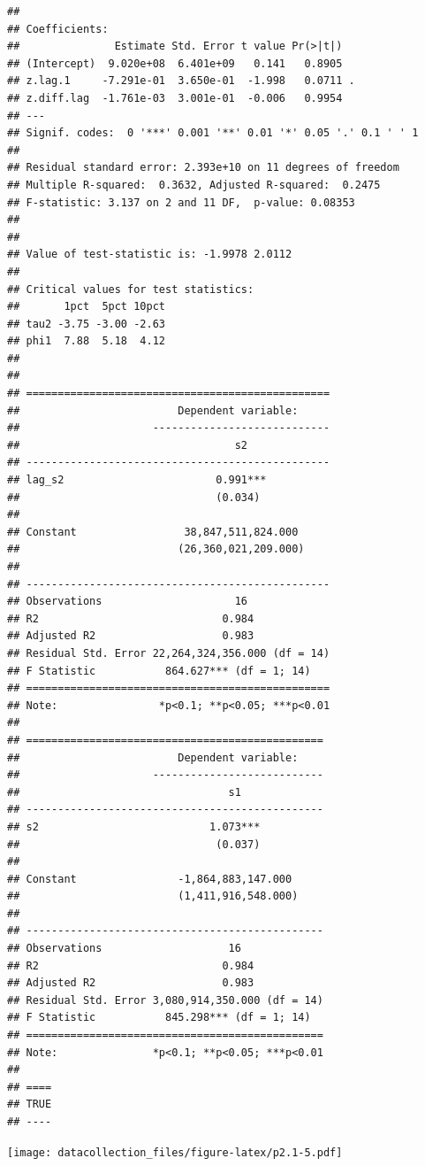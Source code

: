 \documentclass[
]{article}
\begin{document}
\begin{verbatim}
## 
## Coefficients:
##               Estimate Std. Error t value Pr(>|t|)  
## (Intercept)  9.020e+08  6.401e+09   0.141   0.8905  
## z.lag.1     -7.291e-01  3.650e-01  -1.998   0.0711 .
## z.diff.lag  -1.761e-03  3.001e-01  -0.006   0.9954  
## ---
## Signif. codes:  0 '***' 0.001 '**' 0.01 '*' 0.05 '.' 0.1 ' ' 1
## 
## Residual standard error: 2.393e+10 on 11 degrees of freedom
## Multiple R-squared:  0.3632, Adjusted R-squared:  0.2475 
## F-statistic: 3.137 on 2 and 11 DF,  p-value: 0.08353
## 
## 
## Value of test-statistic is: -1.9978 2.0112 
## 
## Critical values for test statistics: 
##       1pct  5pct 10pct
## tau2 -3.75 -3.00 -2.63
## phi1  7.88  5.18  4.12
## 
## 
## ================================================
##                         Dependent variable:     
##                     ----------------------------
##                                  s2             
## ------------------------------------------------
## lag_s2                        0.991***          
##                               (0.034)           
##                                                 
## Constant                 38,847,511,824.000     
##                         (26,360,021,209.000)    
##                                                 
## ------------------------------------------------
## Observations                     16             
## R2                             0.984            
## Adjusted R2                    0.983            
## Residual Std. Error 22,264,324,356.000 (df = 14)
## F Statistic           864.627*** (df = 1; 14)   
## ================================================
## Note:                *p<0.1; **p<0.05; ***p<0.01
## 
## ===============================================
##                         Dependent variable:    
##                     ---------------------------
##                                 s1             
## -----------------------------------------------
## s2                           1.073***          
##                               (0.037)          
##                                                
## Constant                -1,864,883,147.000     
##                         (1,411,916,548.000)    
##                                                
## -----------------------------------------------
## Observations                    16             
## R2                             0.984           
## Adjusted R2                    0.983           
## Residual Std. Error 3,080,914,350.000 (df = 14)
## F Statistic           845.298*** (df = 1; 14)  
## ===============================================
## Note:               *p<0.1; **p<0.05; ***p<0.01
## 
## ====
## TRUE
## ----
\end{verbatim}

\texttt{[image: datacollection\_files/figure-latex/p2.1-5.pdf]}
\end{document}

